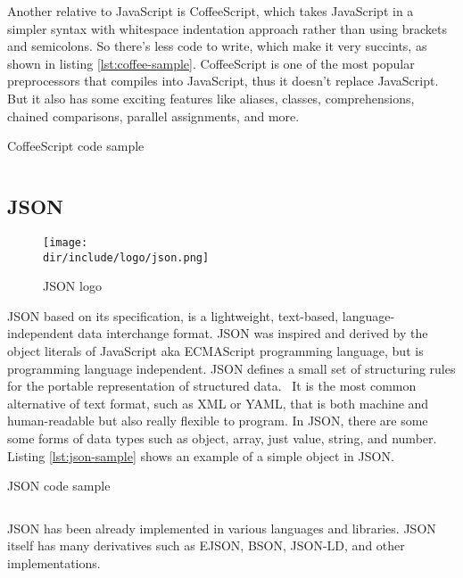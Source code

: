 Another relative to JavaScript is CoffeeScript, which takes JavaScript in a simpler syntax with whitespace indentation approach rather than using brackets and semicolons.
So there's less code to write, which make it very succints, as shown in listing \autoref{lst:coffee-sample}.
CoffeeScript is one of the most popular preprocessors that compiles into JavaScript, thus it doesn't replace JavaScript.
But it also has some exciting features like aliases, classes, comprehensions, chained comparisons, parallel assignments, and more.

\begin{listing}[ht]
\caption{CoffeeScript code sample}
\inputminted{javascript}{\dir/include/coffee-sample.coffee}
\label{lst:coffee-sample}
\end{listing}

\subsection{JSON}

\begin{wrapfigure}{r}{0.5\textwidth}
  \vspace{-20pt}
  \begin{center}
    \texttt{[image: \\dir/include/logo/json.png]}
  \end{center}
  \vspace{-20pt}
  \caption{JSON logo}
  \label{fig:json-logo}
  \vspace{-10pt}
\end{wrapfigure}

\ac{JSON} based on its specification, is a lightweight, text-based, language-independent data interchange format.
\ac{JSON} was inspired and derived by the object literals of JavaScript aka ECMAScript programming language, but is programming language independent.
\ac{JSON} defines a small set of structuring rules for the portable representation of structured data.~\autocite{ECMA:2013:JSON}
It is the most common alternative of text format, such as \ac{XML} or \ac{YAML}, that is both machine and human-readable but also really flexible to program.
In \ac{JSON}, there are some some forms of data types such as object, array, just value, string, and number.
Listing \autoref{lst:json-sample} shows an example of a simple object in \ac{JSON}.

\begin{listing}[ht]
\caption{JSON code sample}
\inputminted{javascript}{\dir/include/json-sample.json}
\label{lst:json-sample}
\end{listing}

JSON has been already implemented in various languages and libraries.
JSON itself has many derivatives such as \ac{EJSON}, \ac{BSON}, \ac{JSON-LD}, and other implementations.
